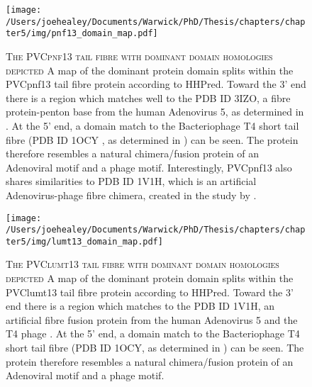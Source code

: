 \begin{figure}[h]
	\centering
	\texttt{[image: /Users/joehealey/Documents/Warwick/PhD/Thesis/chapters/chapter5/img/pnf13\_domain\_map.pdf]}
	\captionsetup{singlelinecheck=off, justification=justified, font=footnotesize, aboveskip=0pt}
	\caption[The domain structure of the PVCpnf13 tail fibre protein]{\textsc{\normalsize The PVCpnf13 tail fibre with dominant domain homologies depicted}\vspace{0.1cm} \newline A map of the dominant protein domain splits within the PVCpnf13 tail fibre protein according to HHPred. Toward the 3' end there is a region which matches well to the PDB ID 3IZO, a fibre protein-penton base from the human Adenovirus 5, as determined in \cite{Liu2011}. At the 5' end, a domain match to the Bacteriophage T4 short tail fibre (PDB ID 1OCY , as determined in \cite{Thomassen2003}) can be seen. The protein therefore resembles a natural chimera/fusion protein of an Adenoviral motif and a phage motif. Interestingly, PVCpnf13 also shares similarities to PDB ID 1V1H, which is an artificial Adenovirus-phage fibre chimera, created in the study by \cite{Papanikolopoulou2004}.}
	\label{pnfdomains}
	\end{figure}
\begin{figure}[h]
	\centering
	\texttt{[image: /Users/joehealey/Documents/Warwick/PhD/Thesis/chapters/chapter5/img/lumt13\_domain\_map.pdf]}
	\captionsetup{singlelinecheck=off, justification=justified, font=footnotesize, aboveskip=0pt}
	\caption[The domain structure of the PVClumt13 tail fibre protein]{\textsc{\normalsize The PVClumt13 tail fibre with dominant domain homologies depicted}\vspace{0.1cm} \newline A map of the dominant protein domain splits within the PVClumt13 tail fibre protein according to HHPred. Toward the 3' end there is a region which matches to the PDB ID 1V1H, an artificial fibre fusion protein from the human Adenovirus 5 and the T4 phage \cite{Papanikolopoulou2004}. At the 5' end, a domain match to the Bacteriophage T4 short tail fibre (PDB ID 1OCY, as determined in \cite{Thomassen2003}) can be seen. The protein therefore resembles a natural chimera/fusion protein of an Adenoviral motif and a phage motif.}
	\label{lumtdomains}
\end{figure}



